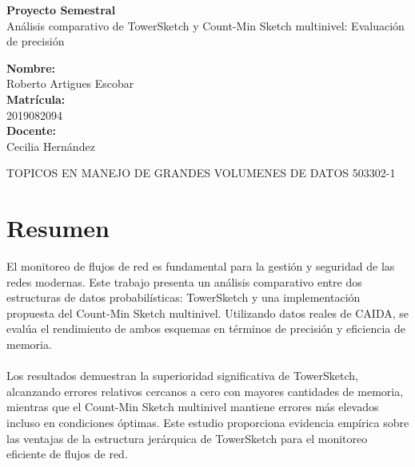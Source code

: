\documentclass[a4paper,12pt]{article}
\begin{document}
\begin{titlepage}
    \centering
    \vspace*{3cm}
    
    {\Huge \textbf{Proyecto Semestral}}\\[1cm]
    
    {\LARGE Análisis comparativo de TowerSketch y Count-Min Sketch multinivel: Evaluación de precisión}\\[3cm]
    
    \vfill
    \begin{flushright}
        \textbf{Nombre:} \\
        Roberto Artigues Escobar \\[1cm]
        
        \textbf{Matrícula:} \\
        2019082094 \\[1cm]
        
        \textbf{Docente:} \\
        Cecilia Hernández
    \end{flushright}
    
    \vfill
    TOPICOS EN MANEJO DE GRANDES VOLUMENES DE DATOS 503302-1 
\end{titlepage}

\tableofcontents
\newpage

\section{Resumen}
El monitoreo de flujos de red es fundamental para la gestión y seguridad de las redes modernas. Este trabajo presenta un análisis comparativo entre dos estructuras de datos probabilísticas: TowerSketch y una implementación propuesta del Count-Min Sketch multinivel.
Utilizando datos reales de CAIDA, se evalúa el rendimiento de ambos esquemas en términos de precisión y eficiencia de memoria. \\ \\ Los resultados demuestran la superioridad significativa de TowerSketch, alcanzando errores relativos cercanos a cero con mayores cantidades 
de memoria, mientras que el Count-Min Sketch multinivel mantiene errores más elevados incluso en condiciones óptimas. Este estudio proporciona evidencia empírica sobre las ventajas de la estructura jerárquica de TowerSketch para el monitoreo eficiente de flujos de red.
\end{document}
